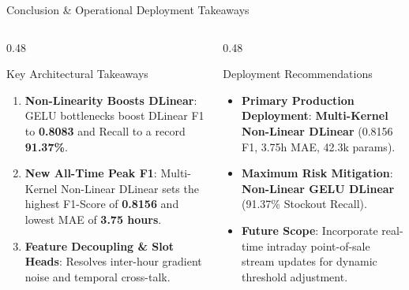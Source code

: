 \documentclass[10pt, aspectratio=169]{beamer}
\begin{document}
\begin{frame}{Conclusion \& Operational Deployment Takeaways}
  \begin{columns}[T]
    \begin{column}{0.48\textwidth}
      \begin{block}{Key Architectural Takeaways}
        \begin{enumerate}
          \item \textbf{Non-Linearity Boosts DLinear}: GELU bottlenecks boost DLinear F1 to \textbf{0.8083} and Recall to a record \textbf{91.37\%}.
          \item \textbf{New All-Time Peak F1}: Multi-Kernel Non-Linear DLinear sets the highest F1-Score of \textbf{0.8156} and lowest MAE of \textbf{3.75 hours}.
          \item \textbf{Feature Decoupling \& Slot Heads}: Resolves inter-hour gradient noise and temporal cross-talk.
        \end{enumerate}
      \end{block}
    \end{column}
    
    \begin{column}{0.48\textwidth}
      \begin{block}{Deployment Recommendations}
        \begin{itemize}
          \item \textbf{Primary Production Deployment}: \textbf{Multi-Kernel Non-Linear DLinear} (0.8156 F1, 3.75h MAE, 42.3k params).
          \item \textbf{Maximum Risk Mitigation}: \textbf{Non-Linear GELU DLinear} (91.37\% Stockout Recall).
          \item \textbf{Future Scope}: Incorporate real-time intraday point-of-sale stream updates for dynamic threshold adjustment.
        \end{itemize}
      \end{block}
    \end{column}
  \end{columns}
\end{frame}
\end{document}
